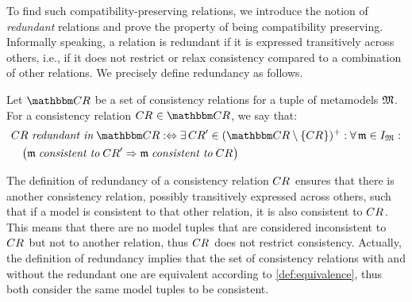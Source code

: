 To find such compatibility-preserving relations, we introduce the notion of \emph{redundant} relations and prove the property of being compatibility preserving.
Informally speaking, a relation is redundant if it is expressed transitively across others, i.e., if it does not restrict or relax consistency compared to a combination of other relations.
We precisely define redundancy as follows.

\begin{definition}
\label{def:redundancy}
    Let $\consistencyrelationset{CR}$ be a set of consistency relations for a tuple of metamodels $\metamodeltuple{M}$.
    For a consistency relation $\consistencyrelation{CR}{} \in \consistencyrelationset{CR}$, we say that:
    \begin{align*}
        &
        \consistencyrelation{CR}{} \redundantinmath \consistencyrelationset{CR} \equivalentperdefinition
        \exists \consistencyrelation{CR}{}' \in \transitiveclosure{(\consistencyrelationset{CR} \setminus \setted{\consistencyrelation{CR}{}})} : 
        \forall \modeltuple{m} \in \metamodeltupleinstanceset{M} :\\
        & \formulaskip
        \big(
            \modeltuple{m} \consistenttomath \consistencyrelation{CR}{}' \Rightarrow \modeltuple{m} \consistenttomath \consistencyrelation{CR}{}
        \big)
    \end{align*}
\end{definition}

The definition of redundancy of a consistency relation $\consistencyrelation{CR}{}$ ensures that there is another consistency relation, possibly transitively expressed across others, such that if a model is consistent to that other relation, it is also consistent to $\consistencyrelation{CR}{}$.
This means that there are no model tuples that are considered inconsistent to $\consistencyrelation{CR}{}$ but not to another relation, thus $\consistencyrelation{CR}{}$ does not restrict consistency.
Actually, the definition of redundancy implies that the set of consistency relations with and without the redundant one are equivalent according to \autoref{def:equivalence}, thus both consider the same model tuples to be consistent.

